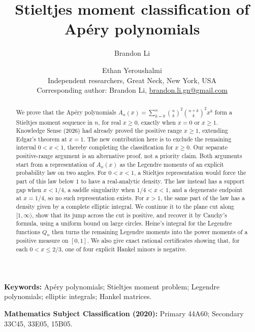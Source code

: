 \documentclass[11pt]{article}
\title{Stieltjes moment classification of Ap\'ery polynomials}
\author{Brandon Li \and Ethan Yeroushalmi\\[0.35em]
 \normalsize Independent researchers, Great Neck, New York, USA\\[0.2em]
 \normalsize Corresponding author: Brandon Li,
 \href{mailto:brandon.li.gn@gmail.com}{brandon.li.gn@gmail.com}}
\date{}
\begin{document}
\maketitle
\begin{abstract}
We prove that the Ap\'ery polynomials
$A_n(x)=\sum_{k=0}^n\binom nk^2\binom{n+k}k^2x^k$ form a Stieltjes
moment sequence in $n$, for real $x\ge0$, exactly when $x=0$ or $x\ge1$.
Knowledge Sense (2026) had already proved the positive range $x\ge1$,
extending Edgar's theorem at $x=1$. The new contribution here is to
exclude the remaining interval $0<x<1$, thereby completing the
classification for $x\ge0$. Our separate positive-range argument is
an alternative proof, not a priority claim. Both arguments start from a
representation of $A_n(x)$ as the Legendre moments of an explicit
probability law on two angles. For $0<x<1$, a Stieltjes representation
would force the part of this law below $1$ to have a real-analytic
density. The law instead has a support gap when $x<1/4$, a saddle
singularity when $1/4<x<1$, and a degenerate endpoint at $x=1/4$, so no
such representation exists. For $x>1$, the same part of the law has a
density given by a complete elliptic integral. We continue it to the plane
cut along $[1,\infty)$, show that its jump across the cut is positive,
and recover it by Cauchy's formula, using a uniform bound on large
circles. Heine's integral for the Legendre functions $Q_n$ then turns the
remaining Legendre moments into the power moments of a positive measure
on $[0,1]$. We also give exact rational certificates showing that, for
each $0<x\le2/3$, one of four explicit Hankel minors is negative.
\end{abstract}
\noindent\textbf{Keywords:} Ap\'ery polynomials; Stieltjes moment problem;
Legendre polynomials; elliptic integrals; Hankel matrices.

\smallskip\noindent\textbf{Mathematics Subject Classification (2020):}
Primary 44A60; Secondary 33C45, 33E05, 15B05.
\end{document}
